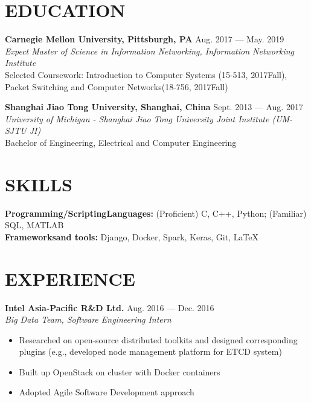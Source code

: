 \documentclass[margin,line,11pt]{res}
\begin{document}
\address{ $\bullet$ wu.hao.cz.21@gmail.com $\bullet$ (412)-616-6280}
 
\begin{resume}

\section{EDUCATION}
{
\small
\textbf{Carnegie Mellon University, Pittsburgh, PA} \hfill Aug. 2017 --- May. 2019\\
\textit{Expect Master of Science in Information Networking, Information Networking Institute}\\
{\small Selected Coursework: Introduction to Computer Systems (15-513, 2017Fall), Packet Switching and Computer Networks(18-756, 2017Fall)} 
}

{
\small
\textbf{Shanghai Jiao Tong University, Shanghai, China} \hfill Sept. 2013 --- Aug. 2017\\
\textit{University of Michigan - Shanghai Jiao Tong University Joint Institute (UM-SJTU JI)}\\
Bachelor of Engineering, Electrical and Computer Engineering
}

\section{SKILLS}
{\small \textbf{Programming/ScriptingLanguages:} (Proficient) C, C++, Python; (Familiar) SQL, MATLAB}\\
{\small \textbf{Frameworksand tools:} Django, Docker, Spark, Keras, Git, \LaTeX}\\

\section{EXPERIENCE}
{\small
{\bf\normalsize Intel Asia-Pacific R\&D Ltd.} \hfill Aug. 2016 --- Dec. 2016 \\
{\it Big Data Team, Software Engineering Intern} 
}
\begin{itemize}
\setlength{\itemsep}{0pt}
\setlength{\parskip}{0pt}
\setlength{\parsep}{0pt}
\item {\small Researched on open-source distributed toolkits and designed corresponding plugins (e.g., developed node management platform for ETCD system)}
\item {\small Built up OpenStack on cluster with Docker containers}
\item {\small Adopted Agile Software Development approach}
\end{itemize}


\end{resume}
\end{document}
